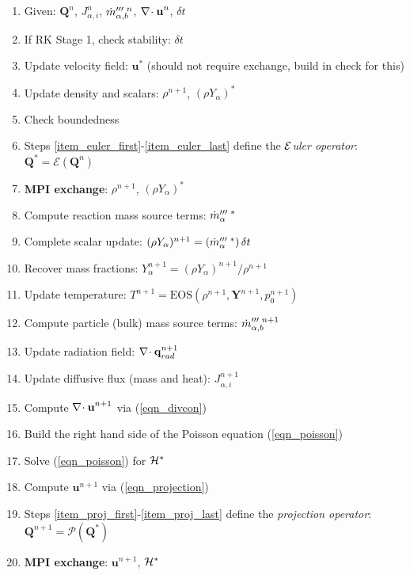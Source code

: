 \documentclass[11pt]{article}
\begin{document}
\begin{enumerate}
\item[] Given: $\mathbf{Q}^n$, $J_{\alpha,i}^n$, $\dot{m}_{\alpha,b}^{{\prime\prime\prime} \,\,n}$, ${\nabla\!\cdot \mathbf{u}}^n$, $\delta t$
\item\label{item_euler_first} If RK Stage 1, check stability: $\delta t$
\item Update velocity field: $\mathbf{u}^*$ (should not require exchange, build in check for this)
\item Update density and scalars: $\rho^{n+1}$, $(\rho Y_\alpha)^*$
\item\label{item_euler_last} Check boundedness
\item[] Steps \ref{item_euler_first}-\ref{item_euler_last} define the \emph{${\cal E}$uler operator}: $\mathbf{Q}^{*} = \mathcal{E}(\mathbf{Q}^n)$
\item\label{item_mpi} \textbf{MPI exchange}: $\rho^{n+1}$, $(\rho Y_\alpha)^*$
\item\label{item_proj_first} Compute reaction mass source terms: $\dot{m}_\alpha^{{\prime\prime\prime}\,\,*}$
\item Complete scalar update:  $(\rho Y_\alpha)^{n+1} = (\dot{m}_\alpha^{{\prime\prime\prime}\,\,*})\,\delta t$
\item Recover mass fractions: $Y_\alpha^{n+1} = (\rho Y_\alpha)^{n+1}/\rho^{n+1}$
\item Update temperature: $T^{n+1} = \mbox{EOS}(\rho^{n+1},\mathbf{Y}^{n+1},p_0^{n+1})$
\item Compute particle (bulk) mass source terms: $\dot{m}_{\alpha,b}^{{\prime\prime\prime}\,\,n+1}$
\item Update radiation field: $\nabla\!\cdot \mathbf{q}_{rad}^{n+1}$
\item Update diffusive flux (mass and heat): $J_{\alpha,i}^{n+1}$
\item Compute ${\nabla\!\cdot \mathbf{u}}^{n+1}$ via (\ref{eqn_divcon})
\item Build the right hand side of the Poisson equation (\ref{eqn_poisson})
\item Solve (\ref{eqn_poisson}) for ${\cal H}^{*}$
\item\label{item_proj_last} Compute $\mathbf{u}^{n+1}$ via (\ref{eqn_projection})
\item[] Steps \ref{item_proj_first}-\ref{item_proj_last} define the \emph{projection operator}: $\mathbf{Q}^{n+1} = \mathcal{P}(\mathbf{Q}^*)$
\item \textbf{MPI exchange}: $\mathbf{u}^{n+1}$, ${\cal H}^{*}$
\end{enumerate}
\end{document}
